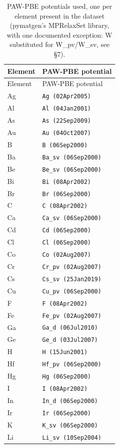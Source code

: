 \begin{longtable}{@{}l l@{}}
\caption{PAW-PBE potentials used, one per element present in the dataset (pymatgen's MPRelaxSet library, with one documented exception: W substituted for W\_pv/W\_sv, see \S7).}\\
\toprule
Element & PAW-PBE potential \\
\midrule
\endfirsthead
\toprule
Element & PAW-PBE potential \\
\midrule
\endhead
\bottomrule
\endfoot
Ag & \texttt{Ag (02Apr2005)} \\
Al & \texttt{Al (04Jan2001)} \\
As & \texttt{As (22Sep2009)} \\
Au & \texttt{Au (04Oct2007)} \\
B & \texttt{B (06Sep2000)} \\
Ba & \texttt{Ba\_sv (06Sep2000)} \\
Be & \texttt{Be\_sv (06Sep2000)} \\
Bi & \texttt{Bi (08Apr2002)} \\
Br & \texttt{Br (06Sep2000)} \\
C & \texttt{C (08Apr2002)} \\
Ca & \texttt{Ca\_sv (06Sep2000)} \\
Cd & \texttt{Cd (06Sep2000)} \\
Cl & \texttt{Cl (06Sep2000)} \\
Co & \texttt{Co (02Aug2007)} \\
Cr & \texttt{Cr\_pv (02Aug2007)} \\
Cs & \texttt{Cs\_sv (25Jan2019)} \\
Cu & \texttt{Cu\_pv (06Sep2000)} \\
F & \texttt{F (08Apr2002)} \\
Fe & \texttt{Fe\_pv (02Aug2007)} \\
Ga & \texttt{Ga\_d (06Jul2010)} \\
Ge & \texttt{Ge\_d (03Jul2007)} \\
H & \texttt{H (15Jun2001)} \\
Hf & \texttt{Hf\_pv (06Sep2000)} \\
Hg & \texttt{Hg (06Sep2000)} \\
I & \texttt{I (08Apr2002)} \\
In & \texttt{In\_d (06Sep2000)} \\
Ir & \texttt{Ir (06Sep2000)} \\
K & \texttt{K\_sv (06Sep2000)} \\
Li & \texttt{Li\_sv (10Sep2004)} \\

\end{longtable}
